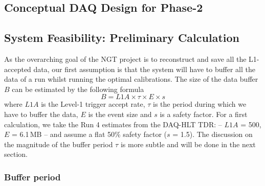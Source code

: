 \subsection{Conceptual DAQ Design for Phase-2}

\subsection{System Feasibility: Preliminary Calculation}

As the overarching goal of the NGT project is to reconstruct and save all the L1-accepted data, 
our first assumption is that the system will have to buffer all the data of a run whilst 
running the optimal calibrations.
The size of the data buffer $B$ can be estimated by the following formula
\begin{equation}
B = L1A \times \tau \times E \times s
\label{eq:buffersize}
\end{equation}
where $L1A$ is the Level-1 trigger accept rate,
$\tau$ is the period during which we have to buffer the data,
$E$ is the event size and
$s$ is a safety factor.
For a first calculation, we take the Run 4 estimates from the DAQ-HLT TDR:
-- $L1A$ = 500\kHz, $E$ = 6.1\,MB --
and assume a flat 50\% safety factor ($s$ = 1.5).
The discussion on the magnitude of the buffer period $\tau$ is more subtle and will be done in the next section.

\subsubsection{Buffer period}

